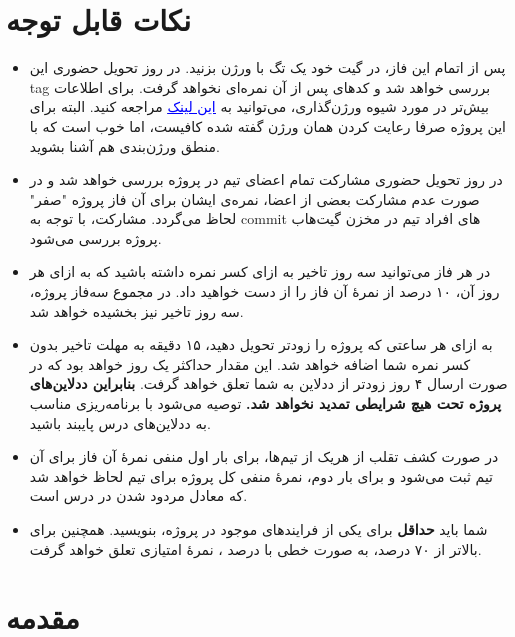 \documentclass[]{article}
\begin{document}
\section*{{\titr نکات قابل توجه}}
\begin{itemize}
\item
پس از اتمام این فاز، در گیت خود یک تگ با ورژن  بزنید. در روز تحویل حضوری این tag بررسی خواهد شد و کدهای پس از آن نمره‌ای نخواهد گرفت. برای اطلاعات بیش‌تر در مورد شیوه ورژن‌گذاری، می‌توانید به
 \href{https://semver.org/}{\textcolor{blue}{\underline{این لینک}}}
 مراجعه کنید. البته برای این پروژه صرفا رعایت کردن همان ورژن گفته شده کافیست، اما خوب‌ است که با منطق ورژن‌بندی هم آشنا بشوید.

\item
در روز تحویل حضوری مشارکت تمام اعضای تیم در پروژه بررسی خواهد‌ شد و در صورت عدم مشارکت بعضی از اعضا، نمره‌ی ایشان برای آن فاز پروژه "صفر" لحاظ می‌گردد. مشارکت، با توجه به commit های افراد تیم در مخزن گیت‌هاب پروژه بررسی می‌شود.

\item
در هر فاز می‌توانید سه روز تاخیر به ازای کسر نمره داشته‌ باشید که به ازای هر روز آن، ۱۰ درصد از نمرهٔ آن فاز را از دست خواهید‌ داد. در مجموع سه‌فاز پروژه، سه روز تاخیر نیز بخشیده خواهد‌ شد.

\item
به ازای هر ساعتی که پروژه را زودتر تحویل دهید، ۱۵ دقیقه به مهلت تاخیر بدون کسر نمره شما اضافه خواهد‌ شد. این مقدار حداکثر یک روز خواهد‌ بود که در صورت ارسال ۴ روز زودتر از ددلاین به شما تعلق خواهد گرفت. \textbf{بنابراین ددلاین‌های پروژه تحت هیچ شرایطی تمدید نخواهد‌ شد.} توصیه می‌شود با برنامه‌ریزی مناسب به ددلاین‌های درس پایبند باشید.

\item
در صورت کشف تقلب از هریک از تیم‌ها، برای بار اول منفی نمرهٔ آن فاز برای آن تیم ثبت می‌شود و برای بار دوم، نمرهٔ منفی کل پروژه برای تیم لحاظ خواهد‌ شد که معادل مردود شدن در درس است.


\item
شما باید \textbf{حداقل} برای یکی از فرایندهای موجود در پروژه،  بنویسید. همچنین برای  بالاتر از ۷۰ درصد، به صورت خطی با درصد ، نمره‌ٔ امتیازی تعلق خواهد گرفت.

\end{itemize}

\newpage

\section*{{\titr مقدمه}}
\end{document}
